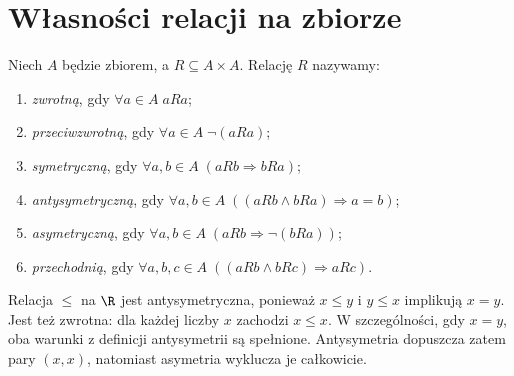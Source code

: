 \section{Własności relacji na zbiorze}\label{sec:relation-properties}
\begin{definicja}\label{def:relation-properties}
Niech $A$ będzie zbiorem, a $R\subseteq A\times A$.
Relację $R$ nazywamy:
\begin{enumerate}[label=(\roman*)]
\item \emph{zwrotną}, gdy $\forall a\in A\;aRa$;
\item \emph{przeciwzwrotną}, gdy $\forall a\in A\;\neg(aRa)$;
\item \emph{symetryczną}, gdy $\forall a,b\in A\;(aRb\Rightarrow bRa)$;
\item \emph{antysymetryczną}, gdy
$\forall a,b\in A\;((aRb\land bRa)\Rightarrow a=b)$;
\item \emph{asymetryczną}, gdy
$\forall a,b\in A\;(aRb\Rightarrow\neg(bRa))$;
\item \emph{przechodnią}, gdy
$\forall a,b,c\in A\;((aRb\land bRc)\Rightarrow aRc)$.
\end{enumerate}
\end{definicja}

\begin{uwaga}
Relacja $\le$ na $\R$ jest antysymetryczna, ponieważ
$x\le y$ i $y\le x$ implikują $x=y$. Jest też zwrotna:
dla każdej liczby $x$ zachodzi $x\le x$. W szczególności,
gdy $x=y$, oba warunki z definicji antysymetrii są spełnione.
Antysymetria dopuszcza zatem pary $(x,x)$, natomiast
asymetria wyklucza je całkowicie.
\end{uwaga}

